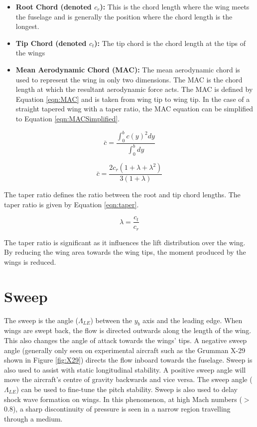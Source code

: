 \begin{itemize}
    \item \textbf{Root Chord (denoted $c_r$):} This is the chord length where the wing meets the fuselage and is generally the position where the chord length is the longest. 
    \item \textbf{Tip Chord (denoted $c_t$):} The tip chord is the chord length at the tips of the wings 
    \item \textbf{Mean Aerodynamic Chord (MAC):} The mean aerodynamic chord is used to represent the wing in only two dimensions. The MAC is the chord length at which the resultant aerodynamic force acts. The MAC is defined by Equation \ref{eqn:MAC} and is taken from wing tip to wing tip. In the case of a straight tapered wing with a taper ratio, the MAC equation can be simplified to Equation \ref{eqn:MACSimplified}.
    
\end{itemize} 

\begin{equation}
    \bar{c} =  \frac{ \int_{0}^{b} c(y)^2 dy}{\int_{0}^{b} dy}
    \label{eqn:MAC}
\end{equation}

\begin{equation}
    \bar{c} =  \frac{ 2c_r(1 + \lambda + \lambda^2)}{3(1 + \lambda)}
    \label{eqn:MACSimplified}
\end{equation}

 The taper ratio defines the ratio between the root and tip chord lengths. The taper ratio is given by Equation \ref{eqn:taper}.
 
 \begin{equation}
     \lambda = \frac{c_t}{c_r}
     \label{eqn:taper}
 \end{equation}
 
 The taper ratio is significant as it influences the lift distribution over the wing. By reducing the wing area towards the wing tips, the moment produced by the wings is reduced. 
 
\section{Sweep}
The sweep is the angle ($\Lambda_{LE}$) between the $y_b$ axis and the leading edge. When wings are swept back, the flow is directed outwards along the length of the wing. This also changes the angle of attack towards the wings' tips. A negative sweep angle (generally only seen on experimental aircraft such as the Grumman X-29 shown in Figure \ref{fig:X29}) directs the flow inboard towards the fuselage. Sweep is also used to assist with static longitudinal stability. A positive sweep angle will move the aircraft's centre of gravity backwards and vice versa. The sweep angle ($\Lambda_{LE}$) can be used to fine-tune the pitch stability. Sweep is also used to delay shock wave formation on wings. In this phenomenon, at high Mach numbers ($>$ 0.8), a sharp discontinuity of pressure is seen in a narrow region travelling through a medium. 

